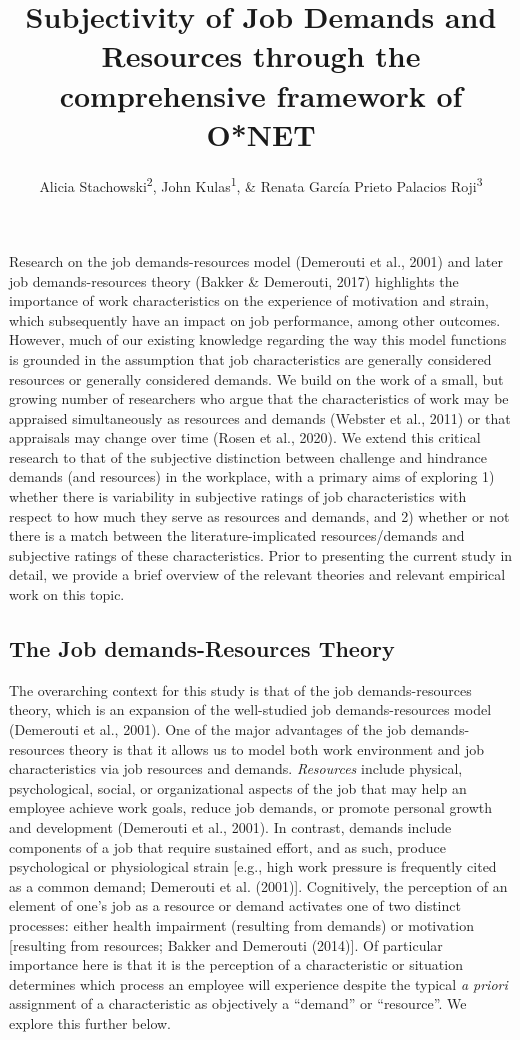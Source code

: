 \documentclass[
  man,mask]{apa6}
\title{Subjectivity of Job Demands and Resources through the comprehensive framework of O*NET}
\author{Alicia Stachowski\textsuperscript{2}, John Kulas\textsuperscript{1}, \& Renata García Prieto Palacios Roji\textsuperscript{3}}
\date{}
\affiliation{\vspace{0.5cm}\textsuperscript{1} eRg\\\textsuperscript{2} University of Wisconsin - Stout\\\textsuperscript{3} PepsiCo}
\begin{document}
\maketitle

Research on the job demands-resources model (Demerouti et al., 2001) and later job demands-resources theory (Bakker \& Demerouti, 2017) highlights the importance of work characteristics on the experience of motivation and strain, which subsequently have an impact on job performance, among other outcomes. However, much of our existing knowledge regarding the way this model functions is grounded in the assumption that job characteristics are generally considered resources or generally considered demands. We build on the work of a small, but growing number of researchers who argue that the characteristics of work may be appraised simultaneously as resources and demands (Webster et al., 2011) or that appraisals may change over time (Rosen et al., 2020). We extend this critical research to that of the subjective distinction between challenge and hindrance demands (and resources) in the workplace, with a primary aims of exploring 1) whether there is variability in subjective ratings of job characteristics with respect to how much they serve as resources and demands, and 2) whether or not there is a match between the literature-implicated resources/demands and subjective ratings of these characteristics. Prior to presenting the current study in detail, we provide a brief overview of the relevant theories and relevant empirical work on this topic.

\hypertarget{the-job-demands-resources-theory}{%
\subsection{The Job demands-Resources Theory}\label{the-job-demands-resources-theory}}

The overarching context for this study is that of the job demands-resources theory, which is an expansion of the well-studied job demands-resources model (Demerouti et al., 2001). One of the major advantages of the job demands-resources theory is that it allows us to model both work environment and job characteristics via job resources and demands. \emph{Resources} include physical, psychological, social, or organizational aspects of the job that may help an employee achieve work goals, reduce job demands, or promote personal growth and development (Demerouti et al., 2001). In contrast, demands include components of a job that require sustained effort, and as such, produce psychological or physiological strain {[}e.g., high work pressure is frequently cited as a common demand; Demerouti et al. (2001){]}. Cognitively, the perception of an element of one's job as a resource or demand activates one of two distinct processes: either health impairment (resulting from demands) or motivation {[}resulting from resources; Bakker and Demerouti (2014){]}. Of particular importance here is that it is the perception of a characteristic or situation determines which process an employee will experience despite the typical \emph{a priori} assignment of a characteristic as objectively a ``demand'' or ``resource''. We explore this further below.
\end{document}

